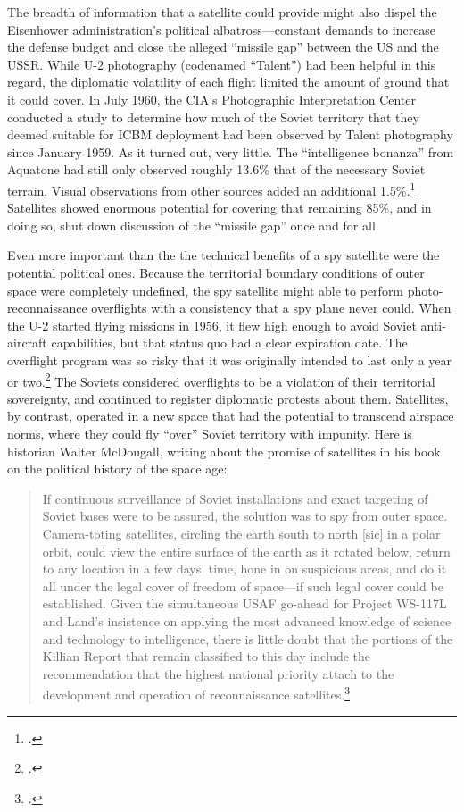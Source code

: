 \documentclass{report}
\begin{document}
The breadth of information that a satellite could provide might also dispel the Eisenhower administration's political albatross---constant demands to increase the defense budget and close the alleged ``missile gap'' between the US and the USSR. While U-2 photography (codenamed ``Talent'') had been helpful in this regard, the diplomatic volatility of each flight limited the amount of ground that it could cover. In July 1960, the CIA's Photographic Interpretation Center conducted a study to determine how much of the Soviet territory that they deemed suitable for ICBM deployment had been observed by Talent photography since January 1959. As it turned out, very little. The ``intelligence bonanza'' from Aquatone had still only observed roughly 13.6\% that of the necessary Soviet terrain. Visual observations from other sources added an additional 1.5\%.\footcite[A significant portion of this document is redacted, including, for some reason, the page numbers.]{cia_future_1960} Satellites showed enormous potential for covering that remaining 85\%, and in doing so, shut down discussion of the ``missile gap'' once and for all.

Even more important than the the technical benefits of a spy satellite were the potential political ones. Because the territorial boundary conditions of outer space were completely undefined, the spy satellite might able to perform photo-reconnaissance overflights with a consistency that a spy plane never could. When the U-2 started flying missions in 1956, it flew high enough to avoid Soviet anti-aircraft capabilities, but that status quo had a clear expiration date. The overflight program was so risky that it was originally intended to last only a year or two.\footcite[p.~33]{lindgren_trust_2000} The Soviets considered overflights to be a violation of their territorial sovereignty, and continued to register diplomatic protests about them. Satellites, by contrast, operated in a new space that had the potential to transcend airspace norms, where they could fly ``over'' Soviet territory with impunity. Here is historian Walter McDougall, writing about the promise of satellites in his book on the political history of the space age:

\begin{quote}
	If continuous surveillance of Soviet installations and exact targeting of Soviet bases were to be assured, the solution was to spy from outer space. Camera-toting satellites, circling the earth south to north [sic] in a polar orbit, could view the entire surface of the earth as it rotated below, return to any location in a few days' time, hone in on suspicious areas, and do it all under the legal cover of freedom of space---if such legal cover could be established. Given the simultaneous USAF go-ahead for Project WS-117L and Land's insistence on applying the most advanced knowledge of science and technology to intelligence, there is little doubt that the portions of the Killian Report that remain classified to this day include the recommendation that the highest national priority attach to the development and operation of reconnaissance satellites.\footcite[p.~117]{mcdougall_heavens_1985}
\end{quote}
\end{document}
